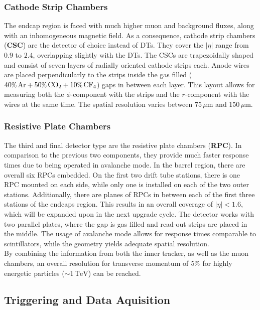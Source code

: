\subsubsection{Cathode Strip Chambers}

The endcap region is faced with much higher muon and background fluxes, along with an inhomogeneous magnetic field. As a consequence, cathode strip chambers (\textbf{CSC}) are the detector of choice instead of DTs. They cover the $|\eta|$ range from $0.9$ to $2.4$, overlapping slightly with the DTs. The CSCs are trapezoidally shaped and consist of seven layers of radially oriented cathode strips each. Anode wires are placed perpendicularly to the strips inside the gas filled ($40\pct\,\text{Ar} + 50\pct\,\text{CO}_2 + 10\pct\,\text{CF}_4$) gaps in between each layer. This layout allows for measuring both the $\phi$-component with the strips and the $r$-component with the wires at the same time. The spatial resolution varies between $75\,\mu\text{m}$ and $150\,\mu\text{m}$.

\subsubsection{Resistive Plate Chambers}

The third and final detector type are the resistive plate chambers (\textbf{RPC}). In comparison to the previous two components, they provide much faster response times due to being operated in avalanche mode. In the barrel region, there are overall six RPCs embedded. On the first two drift tube stations, there is one RPC mounted on each side, while only one is installed on each of the two outer stations. Additionally, there are planes of RPCs in between each of the first three stations of the endcaps region. This results in an overall coverage of $|\eta| < 1.6$, which will be expanded upon in the next upgrade cycle. The detector works with two parallel plates, where the gap is gas filled and read-out strips are placed in the middle. The usage of avalanche mode allows for response times comparable to scintillators, while the geometry yields adequate spatial resolution. \\

By combining the information from both the inner tracker, as well as the muon chambers, an overall resolution for transverse momentum of $5\pct$ for highly energetic particles ($\sim 1\,\text{TeV}$) can be reached.



\subsection{Triggering and Data Aquisition}

